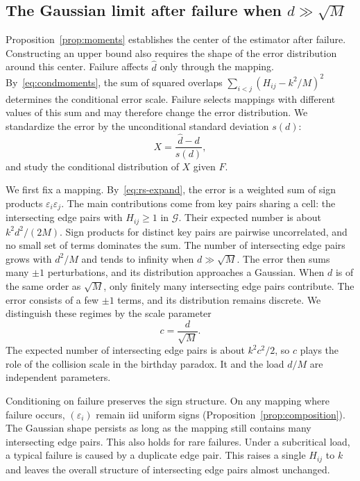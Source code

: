 \subsection{\texorpdfstring{The Gaussian limit after failure when $d\gg\sqrt M$}{The Gaussian limit after failure when d >> sqrt(M)}}
Proposition~\ref{prop:moments} establishes the center of the estimator after failure. Constructing an upper bound also requires the shape of the error distribution around this center. Failure affects $\widehat d$ only through the mapping. By~\eqref{eq:condmoments}, the sum of squared overlaps $\sum_{i<j}(H_{ij}-k^2/M)^2$ determines the conditional error scale. Failure selects mappings with different values of this sum and may therefore change the error distribution. We standardize the error by the unconditional standard deviation $s(d)$:
\begin{equation}
X=\frac{\widehat d-d}{s(d)},\label{eq:X}
\end{equation}
and study the conditional distribution of $X$ given $F$.

We first fix a mapping. By~\eqref{eq:rs-expand}, the error is a weighted sum of sign products $\varepsilon_i\varepsilon_j$. The main contributions come from key pairs sharing a cell: the intersecting edge pairs with $H_{ij}\ge1$ in $\mathcal G$. Their expected number is about $k^2d^2/(2M)$. Sign products for distinct key pairs are pairwise uncorrelated, and no small set of terms dominates the sum. The number of intersecting edge pairs grows with $d^2/M$ and tends to infinity when $d\gg\sqrt M$. The error then sums many $\pm1$ perturbations, and its distribution approaches a Gaussian. When $d$ is of the same order as $\sqrt M$, only finitely many intersecting edge pairs contribute. The error consists of a few $\pm1$ terms, and its distribution remains discrete. We distinguish these regimes by the scale parameter
\begin{equation}
c=\frac{d}{\sqrt M}.\label{eq:c}
\end{equation}
The expected number of intersecting edge pairs is about $k^2c^2/2$, so $c$ plays the role of the collision scale in the birthday paradox\cite{arratia1989chen,dw}. It and the load $d/M$ are independent parameters.

Conditioning on failure preserves the sign structure. On any mapping where failure occurs, $(\varepsilon_i)$ remain iid uniform signs (Proposition~\ref{prop:composition}). The Gaussian shape persists as long as the mapping still contains many intersecting edge pairs. This also holds for rare failures. Under a subcritical load, a typical failure is caused by a duplicate edge pair. This raises a single $H_{ij}$ to $k$ and leaves the overall structure of intersecting edge pairs almost unchanged.

